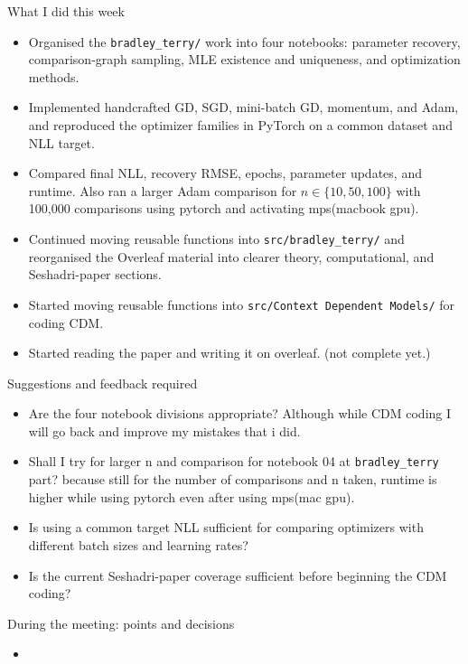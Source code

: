 \documentclass[10pt]{article}
\begin{document}
\begin{weeklybox}{What I did this week}
  \small
  \begin{itemize}
    \item Organised the \texttt{bradley\_terry/} work into four notebooks: parameter recovery, comparison-graph sampling, MLE existence and uniqueness, and optimization methods.
    \item Implemented handcrafted GD, SGD, mini-batch GD, momentum, and Adam, and reproduced the optimizer families in PyTorch on a common dataset and NLL target.
    \item Compared final NLL, recovery RMSE, epochs, parameter updates, and runtime. Also ran a larger Adam comparison for $n\in\{10,50,100\}$ with 100,000 comparisons using pytorch and activating mps(macbook gpu).
    \item Continued moving reusable functions into \texttt{src/bradley\_terry/} and reorganised the Overleaf material into clearer theory, computational, and Seshadri-paper sections.
    \item Started moving reusable functions into \texttt{src/Context Dependent Models/} for coding CDM.
    \item Started reading the paper and writing it on overleaf. (not complete yet.)
  \end{itemize}
  
\end{weeklybox}

\begin{weeklybox}{Suggestions and feedback required}
  \small
  \begin{itemize}
    \item Are the four notebook divisions appropriate? Although while CDM coding I will go back and improve my mistakes that i did. 
    \item Shall I try for larger n and comparison for notebook 04 at \texttt{bradley\_terry} part? because still for the number of comparisons and n taken, runtime is higher while using pytorch even after using mps(mac gpu).
    \item Is using a common target NLL sufficient for comparing optimizers with different batch sizes and learning rates?
    \item Is the current Seshadri-paper coverage sufficient before beginning the CDM coding?
  \end{itemize}
\end{weeklybox}


\begin{weeklybox}{During the meeting: points and decisions}
  \small
  \begin{itemize}
    \item 
  \end{itemize}
\end{weeklybox}
\end{document}
